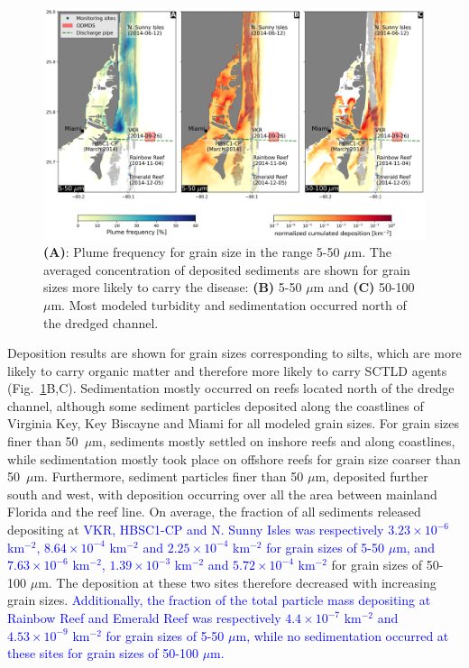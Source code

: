 \documentclass[preprint,12pt,authoryear]{elsarticle}
\newcommand{\modif}[1]{\textcolor{blue}{#1}}
\begin{document}
\begin{figure}
	\centering
	\includegraphics[width=\textwidth]{figures/fig2_stokes4.png}
	\caption{\textbf{(A)}: Plume frequency for grain size in the range 5-50 $\mu$m. The averaged concentration of deposited sediments are shown for grain sizes more likely to carry the disease: \textbf{(B)} 5-50 $\mu$m and \textbf{(C)} 50-100 $\mu$m. Most modeled turbidity and sedimentation occurred north of the dredged channel.}
	\label{fig:onset_depo}
\end{figure}

Deposition results are shown for grain sizes corresponding to silts, which are more likely to carry organic matter and therefore more likely to carry SCTLD agents \citep{erftemeijer2012environmental}(Fig.~\ref{fig:onset_depo}B,C). Sedimentation mostly occurred on reefs located north of the dredge channel, although some sediment particles deposited along the coastlines of Virginia Key, Key Biscayne and Miami for all modeled grain sizes. For grain sizes finer than 50~$\mu$m, sediments mostly settled on inshore reefs and along coastlines, while sedimentation mostly took place on offshore reefs for grain size coarser than 50~$\mu$m. Furthermore, sediment particles finer than 50 $\mu$m, deposited further south and west, with deposition occurring over all the area between mainland Florida and the reef line. On average, the fraction of all sediments released depositing at \modif{ VKR, HBSC1-CP and N. Sunny Isles was respectively $3.23\times10^{-6}$ km$^{-2}$, $8.64\times10^{-4}$ km$^{-2}$ and $2.25\times10^{-4}$ km$^{-2}$ for grain sizes of 5-50 $\mu$m, and $7.63\times10^{-6}$ km$^{-2}$, $1.39\times10^{-3}$ km$^{-2}$ and $5.72\times 10^{-4}$ km$^{-2}$} for grain sizes of 50-100 $\mu$m. The deposition at these two sites therefore decreased with increasing grain sizes. \modif{Additionally, the fraction of the total particle mass depositing at Rainbow Reef and Emerald Reef was respectively $4.4\times10^{-7}$ km$^{-2}$ and $4.53\times10^{-9}$ km$^{-2}$ for grain sizes of 5-50 $\mu$m, while no sedimentation occurred at these sites for grain sizes of 50-100 $\mu$m.}
\end{document}
